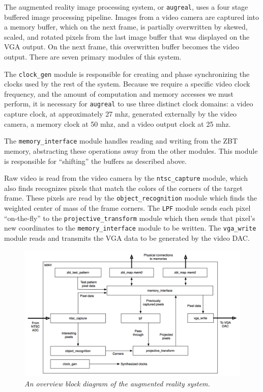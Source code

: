 \documentclass[10pt]{article}
\begin{document}
The augmented reality image processing system, or {\tt augreal}, uses a four stage buffered image processing pipeline. Images from a video camera are captured into a memory buffer, which on the next frame, is partially overwritten by skewed, scaled, and rotated pixels from the last image buffer that was displayed on the VGA output. On the next frame, this overwritten buffer becomes the video output. There are seven primary modules of this system.

The {\tt clock\_gen} module is responsible for creating and phase synchronizing the clocks used by the rest of the system. Because we require a specific video clock frequency, and the amount of computation and memory accesses we must perform, it is necessary for {\tt augreal} to use three distinct clock domains: a video capture clock, at approximately 27 mhz, generated externally by the video camera, a memory clock at 50 mhz, and a video output clock at 25 mhz.

The {\tt memory\_interface} module handles reading and writing from the ZBT memory, abstracting these operations away from the other modules. This module is responsible for ``shifting'' the buffers as described above.

Raw video is read from the video camera by the {\tt ntsc\_capture} module, which also finds recognizes pixels that match the colors of the corners of the target frame. These pixels are read by the {\tt object\_recognition} module which finds the weighted center of mass of the frame corners. The {\tt LPF} module sends each pixel ``on-the-fly'' to the {\tt projective\_transform} module which then sends that pixel's new coordinates to the {\tt memory\_interface} module to be written. The {\tt vga\_write} module reads and transmits the VGA data to be generated by the video DAC.

\begin{figure}[h!]
\centering
\includegraphics[width=\textwidth]{images/simplified_block_diagram.png}
\caption{\emph{An overview block diagram of the augmented reality system.}}
\end{figure}
\end{document}
